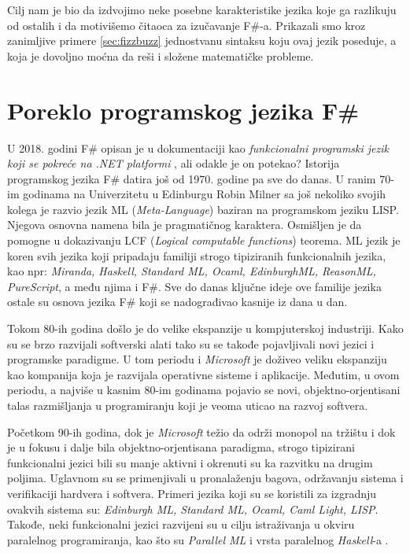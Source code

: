 \documentclass[a4paper]{article}
\begin{document}
Cilj nam je bio da izdvojimo neke posebne karakteristike jezika koje ga razlikuju od ostalih i da motivišemo čitaoca za izučavanje F\#-a. Prikazali smo kroz zanimljive primere \ref{sec:fizzbuzz} jednostvanu sintaksu koju ovaj jezik poseduje, a koja je dovoljno moćna da reši i složene matematičke probleme.

\section{Poreklo programskog jezika F\#}
\label{sec:poreklo}

U 2018. godini F\# opisan je u dokumentaciji kao {\em funkcionalni programski jezik koji se pokreće na .NET platformi} \cite{early_history}, ali odakle je on potekao? Istorija programskog jezika F\# datira još od 1970. godine pa sve do danas. U ranim 70-im godinama na Univerzitetu u Edinburgu Robin Milner sa još nekoliko svojih kolega je razvio jezik ML ({\em Meta-Language}) baziran na programskom jeziku LISP. Njegova osnovna namena bila je pragmatičnog karaktera. Osmišljen je da pomogne u dokazivanju LCF ({\em Logical computable functions}) \cite{Milner:1972:LCF:891954} teorema. ML jezik je koren svih jezika koji pripadaju familiji strogo tipiziranih funkcionalnih jezika, kao npr: {\em Miranda, Haskell, Standard ML, Ocaml, EdinburghML, ReasonML, PureScript}, a među njima i F\#. Sve do danas ključne ideje ove familije jezika ostale su osnova jezika F\# koji se nadograđivao kasnije iz dana u dan. 

Tokom 80-ih godina došlo je do velike ekspanzije u kompjuterskoj industriji. Kako su se brzo razvijali softverski alati tako su se takođe pojavljivali novi jezici i programske paradigme. U tom periodu i {\em Microsoft} je doživeo veliku ekspanziju kao kompanija koja je razvijala operativne sisteme i aplikacije. Međutim, u ovom periodu, a najviše u kasnim 80-im godinama pojavio se novi, objektno-orjentisani talas razmišljanja u programiranju koji je veoma uticao na razvoj softvera.

Početkom 90-ih godina, dok je {\em Microsoft} težio da održi monopol na tržištu i dok je u fokusu i dalje bila objektno-orjentisana paradigma, strogo tipizirani funkcionalni jezici bili su manje aktivni i okrenuti su ka razvitku na drugim poljima. Uglavnom su se primenjivali u pronalaženju bagova, održavanju sistema i verifikaciji hardvera i softvera. Primeri jezika koji su se koristili za izgradnju ovakvih sistema su: {\em Edinburgh ML, Standard ML, Ocaml, Caml Light, LISP}. Takođe, neki funkcionalni jezici razvijeni su u cilju istraživanja u okviru paralelnog programiranja, kao što su {\em Parallel ML} i vrsta paralelnog {\em Haskell}-a \cite{early_history}. 
\end{document}
